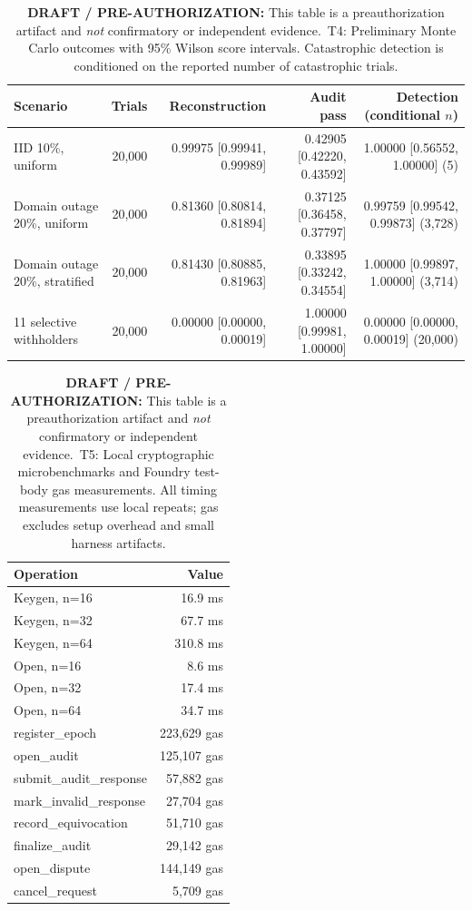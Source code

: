 \documentclass[10pt]{article}
\newcommand{\KeystoneDraftTableNotice}{\textbf{DRAFT / PRE-AUTHORIZATION:} This table is a preauthorization artifact and \textit{not} confirmatory or independent evidence.}
\begin{document}
\begin{table}[h]
\centering
\caption[\texorpdfstring{T4: Preliminary Monte Carlo outcomes}{T4: Preliminary Monte Carlo outcomes}]{\KeystoneDraftTableNotice\ \newline T4: Preliminary Monte Carlo outcomes with 95\% Wilson score intervals. Catastrophic detection is conditioned on the reported number of catastrophic trials.}
\label{tab:t4}
\small
\begin{tabular}{lrrrr}
\toprule
Scenario & Trials & Reconstruction & Audit pass & Detection (conditional $n$) \\
\midrule
IID 10\%, uniform & 20,000 & 0.99975 [0.99941, 0.99989] & 0.42905 [0.42220, 0.43592] & 1.00000 [0.56552, 1.00000] (5) \\
Domain outage 20\%, uniform & 20,000 & 0.81360 [0.80814, 0.81894] & 0.37125 [0.36458, 0.37797] & 0.99759 [0.99542, 0.99873] (3,728) \\
Domain outage 20\%, stratified & 20,000 & 0.81430 [0.80885, 0.81963] & 0.33895 [0.33242, 0.34554] & 1.00000 [0.99897, 1.00000] (3,714) \\
11 selective withholders & 20,000 & 0.00000 [0.00000, 0.00019] & 1.00000 [0.99981, 1.00000] & 0.00000 [0.00000, 0.00019] (20,000) \\
\bottomrule
\end{tabular}
\end{table}

\begin{table}[h]
\centering
\caption[\texorpdfstring{T5: Real-world feasibility and resource boundary}{T5: Real-world feasibility and resource boundary}]{\KeystoneDraftTableNotice\ \newline T5: Local cryptographic microbenchmarks and Foundry test-body gas measurements. All timing measurements use local repeats; gas excludes setup overhead and small harness artifacts.}
\label{tab:t5}
\small
\begin{tabular}{lr}
\toprule
Operation & Value \\
\midrule
Keygen, n=16 & 16.9 ms \\
Keygen, n=32 & 67.7 ms \\
Keygen, n=64 & 310.8 ms \\
Open, n=16 & 8.6 ms \\
Open, n=32 & 17.4 ms \\
Open, n=64 & 34.7 ms \\
\addlinespace
register\_epoch & 223,629 gas \\
open\_audit & 125,107 gas \\
submit\_audit\_response & 57,882 gas \\
mark\_invalid\_response & 27,704 gas \\
record\_equivocation & 51,710 gas \\
finalize\_audit & 29,142 gas \\
open\_dispute & 144,149 gas \\
cancel\_request & 5,709 gas \\
\bottomrule
\end{tabular}
\end{table}
\end{document}
